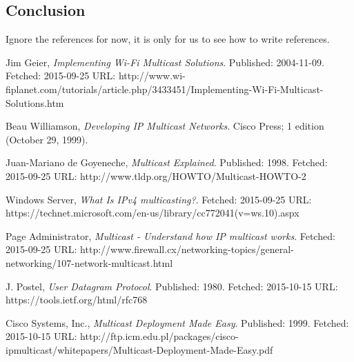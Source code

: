 \documentclass[9pt,a4paper]{acmproc}
\begin{document}
\subsection{Conclusion}

\clearpage
Ignore the references for now, it is only for us to see how to write references.
\begin{thebibliography}{9}

  Jim Geier,
  \emph{Implementing Wi-Fi Multicast Solutions}.
  \newline
  Published: 2004-11-09. Fetched: 2015-09-25 \newline
  URL: http://www.wi-fiplanet.com/tutorials/article.php/3433451/Implementing-Wi-Fi-Multicast-Solutions.htm
  
	Beau Williamson,
	\emph{Developing IP Multicast Networks}.
	\newline
Cisco Press; 1 edition (October 29, 1999).

  Juan-Mariano de Goyeneche,
  \emph{Multicast Explained}.
  \newline
  Published: 1998. Fetched: 2015-09-25 \newline
  URL: http://www.tldp.org/HOWTO/Multicast-HOWTO-2
  
  Windows Server,
  \emph{What Is IPv4 multicasting?}.
  \newline
  Fetched: 2015-09-25 \newline
  URL: https://technet.microsoft.com/en-us/library/cc772041(v=ws.10).aspx
  
  Page Administrator,
  \emph{Multicast - Understand how IP multicast works}.
  \newline
  Fetched: 2015-09-25 \newline
  URL: http://www.firewall.cx/networking-topics/general-networking/107-network-multicast.html
  
  J. Postel,
  \emph{User Datagram Protocol}.
  \newline
  Published: 1980. Fetched: 2015-10-15 \newline
  URL: https://tools.ietf.org/html/rfc768
  
  Cisco Systems, Inc.,
  \emph{Multicast Deployment Made Easy}.
  \newline
  Published: 1999. Fetched: 2015-10-15 \newline
  URL: http://ftp.icm.edu.pl/packages/cisco-ipmulticast/whitepapers/Multicast-Deployment-Made-Easy.pdf
  



\end{thebibliography}
\end{document}
